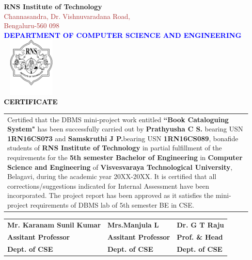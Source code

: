 \thispagestyle{empty}
\begin{center}
\break\break
\textup{\large {\textcolor{darkbrown}{\bf RNS Institute of Technology}} \\ 
{\normalsize{\textcolor{brown}{Channasandra, Dr. Vishnuvaradana Road,\\ Bengaluru-560 098}}}}\\[0.1in]
\textup{\normalsize {\textcolor{blue}{\bf DEPARTMENT OF COMPUTER SCIENCE AND ENGINEERING}}}\\[0.1in]
\includegraphics[width=3cm, height=3cm]{./RNS_logo.png}\\[0.1in]
\textup{\large {\textcolor{black}{\textbf {CERTIFICATE}}}} \\[0.1in]
\end{center}

\justify
\begin{tabular}{p{15cm}}
\hspace{0.4cm} Certified that the DBMS mini-project work entitled \textbf{``Book Cataloguing System"} has been successfully carried out by \textbf{Prathyusha C S.} bearing USN \textbf{1RN16CS073} and \textbf{Samskruthi J P.}bearing USN \textbf{1RN16CS089}, bonafide students of \textbf{RNS Institute of Technology } in partial fulfillment of the requirements for the \textbf{5th semester Bachelor of Engineering} in \textbf{Computer Science and Engineering} of \textbf{Visvesvaraya Technological University}, Belagavi, during the academic year 20XX-20XX. It is certified that all corrections/suggestions indicated for Internal Assessment have been incorporated. The project report has been approved as it satisfies the mini-project requirements of DBMS lab of 5th semester BE in CSE.\\[0.7in]
\end{tabular}

\justify
\begin{tabular}{l  l  l}
\textbf{Mr. Karanam Sunil Kumar} & \hspace{0.7cm}\textbf{Mrs.Manjula L} & \hspace{0.7cm}\textbf{Dr. G T Raju}\\
\textbf{Assitant Professor} & \hspace{0.7cm}\textbf{Assitant Professor}  & \hspace{0.7cm}\textbf{Prof. \& Head}\\
\textbf{Dept. of CSE} & \hspace{0.7cm}\textbf{Dept. of CSE}  & \hspace{0.7cm}\textbf{Dept. of CSE}\\[0.2in]
\end{tabular}
\\[0.3in]

